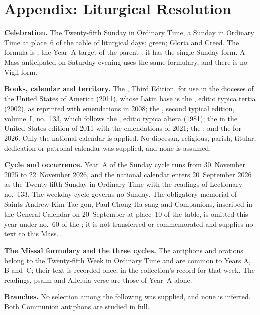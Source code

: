\section{Appendix: Liturgical Resolution}
\label{sec:liturgical-resolution}

{\small
\textbf{Celebration.} The Twenty-fifth Sunday in Ordinary Time, a Sunday in
Ordinary Time at place~6 of the table of liturgical days; green; Gloria and
Creed. The formula is , the Year~A target of the parent
; it has the single Sunday form. A Mass anticipated on Saturday
evening uses the same formulary, and there is no Vigil form.

\textbf{Books, calendar and territory.} The , Third
Edition, for use in the dioceses of the United States of America (2011), whose
Latin base is the , editio typica tertia (2002), as
reprinted with emendations in 2008; the , second typical edition,
volume~I, no.~133, which follows the , editio
typica altera (1981); the  in the
United States edition of 2011 with the emendations of 2021; the
; and the
 for
2026. Only the national calendar is applied. No diocesan, religious, parish,
titular, dedication or patronal calendar was supplied, and none is assumed.

\textbf{Cycle and occurrence.} Year~A of the Sunday cycle runs from 30~November
2025 to 22~November 2026, and the national calendar enters 20~September 2026
as the Twenty-fifth Sunday in Ordinary Time with the readings of Lectionary
no.~133. The weekday cycle governs no Sunday. The obligatory memorial of Saints
Andrew Kim Tae-gon, Paul Chong Ha-sang and Companions, inscribed in the General
Calendar on 20~September at place~10 of the table, is omitted this year under
no.~60 of the ; it is not transferred or commemorated and
supplies no text to this Mass.

\textbf{The Missal formulary and the three cycles.} The antiphons and orations
belong to the Twenty-fifth Week in Ordinary Time and are common to Years A, B
and~C; their text is recorded once, in the collection's record for that week.
The readings, psalm and Alleluia verse are those of Year~A alone.

\textbf{Branches.} No selection among the following was supplied, and none is
inferred. Both Communion antiphons are studied in full.
\par}

